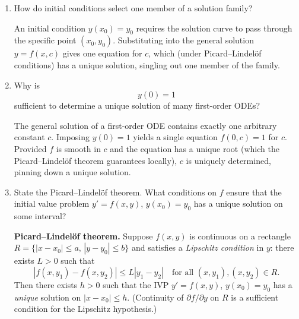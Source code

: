 \documentclass{self-check}
\begin{document}
\begin{enumerate}[leftmargin=*, itemsep=8pt]
    \begin{answer} A first-order ODE specifies the slope $y'$ at
      each point but does not fix which curve passes through a given
      point.  Each choice of integration constant $c$ selects a
      different integral curve; collectively these integral
      curves---one for each $c$---form a one-parameter family that
      ``fills'' the plane (under good conditions without crossings),
      and the ODE governs all of them simultaneously.
    \end{answer}

  \item How do initial conditions select one member of a solution family?

    \begin{answer} An initial condition $y(x_0)=y_0$ requires the
      solution curve to pass through the specific point $(x_0,y_0)$.
      Substituting into the general solution $y=f(x,c)$ gives one
      equation for $c$, which (under Picard--Lindelöf conditions) has a
      unique solution, singling out one member of the family.
    \end{answer}

  \item Why is \[ y(0)=1 \] sufficient to determine a unique solution
    of many first-order ODEs?

    \begin{answer} The general solution of a first-order ODE
      contains exactly one arbitrary constant $c$.  Imposing $y(0)=1$
      yields a single equation $f(0,c)=1$ for $c$.  Provided $f$ is
      smooth in $c$ and the equation has a unique root (which the
      Picard--Lindelöf theorem guarantees locally), $c$ is uniquely
      determined, pinning down a unique solution.
    \end{answer}

  \item State the Picard--Lindel\"of theorem. What conditions on $f$
    ensure that the initial value problem $y'=f(x,y)$, $y(x_0)=y_0$
    has a unique solution on some interval?

    \begin{answer} \textbf{Picard--Lindelöf theorem.}  Suppose
      $f(x,y)$ is continuous on a rectangle $R=\{|x-x_0|\le
      a,\,|y-y_0|\le b\}$ and satisfies a \emph{Lipschitz condition} in
      $y$: there exists $L>0$ such that
      \[
        |f(x,y_1)-f(x,y_2)| \le L|y_1-y_2| \quad \text{for all }
        (x,y_1),(x,y_2)\in R.
      \]
      Then there exists $h>0$ such that the IVP $y'=f(x,y)$,
      $y(x_0)=y_0$ has a \emph{unique} solution on $|x-x_0|\le h$.
      (Continuity of $\partial f/\partial y$ on $R$ is a sufficient
      condition for the Lipschitz hypothesis.)
    \end{answer}


\end{enumerate}
\end{document}

